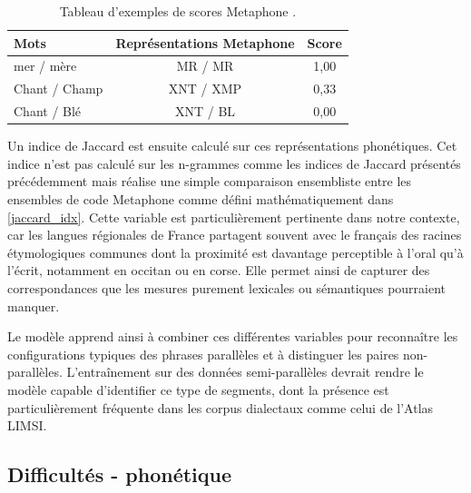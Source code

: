 \begin{table}[H]
\centering
\begin{tabular}{lcS}
\hline
\textbf{Mots} & \textbf{Représentations Metaphone} & \textbf{Score} \\
\hline
mer / mère & MR / MR & 1,00 \\
Chant / Champ & XNT / XMP & 0,33 \\
Chant / Blé & XNT / BL & 0,00 \\
\hline
\end{tabular}
\caption{Tableau d'exemples de scores Metaphone \citep{philips_1990}.}
\label{metaphone}
\end{table}

Un indice de Jaccard est ensuite calculé sur ces représentations
phonétiques. Cet indice n'est pas calculé sur les n-grammes comme les indices de Jaccard présentés précédemment mais
réalise une simple comparaison ensembliste entre les ensembles de code Metaphone comme défini mathématiquement dans \ref{jaccard_idx}.
Cette variable est particulièrement pertinente dans notre contexte, car les langues régionales de
France partagent souvent avec le français des racines étymologiques communes dont la proximité est davantage
perceptible à l'oral qu'à l'écrit, notamment en occitan ou en corse. Elle permet ainsi de capturer des
correspondances que les mesures purement lexicales ou sémantiques pourraient manquer.

Le modèle apprend ainsi à combiner ces différentes variables pour reconnaître les configurations
typiques des phrases parallèles et à distinguer les paires non-parallèles. L'entraînement sur des données
semi-parallèles devrait rendre le modèle capable d'identifier ce type de segments, dont la présence
est particulièrement fréquente dans les corpus dialectaux comme celui de l'Atlas LIMSI.

\subsection{Difficultés - phonétique}

